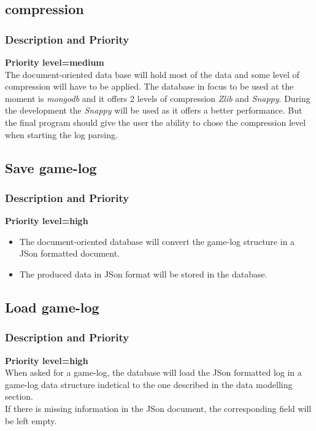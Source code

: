 \documentclass{scrreprt}
\begin{document}
\subsection{compression}
\subsubsection{Description and Priority}
\textbf{Priority level=medium}\\
The document-oriented data base will hold most of the data and some level of compression
will have to be applied.
The database in focus to be used at the moment is \textit{mongodb} and it offers
2 levels of compression \textit{Zlib} and \textit{Snappy}.
During the development the \textit{Snappy} will be used as it offers a better
performance.
But the final program should give the user the ability to chose the compression
level when starting the log parsing.


\subsection{Save game-log}
\subsubsection{Description and Priority}
\textbf{Priority level=high}\\
\begin{itemize}
\item The document-oriented database will convert the game-log structure in a JSon formatted document.
\item The produced data in JSon format will be stored in the database.
\end{itemize}

\subsection{Load game-log}
\subsubsection{Description and Priority}
\textbf{Priority level=high}\\
When asked for a game-log, the database will load the JSon formatted log in a game-log data structure indetical to the one described in the data modelling section.\\
If there is missing information in the JSon document, the corresponding field will be left empty.
\end{document}
